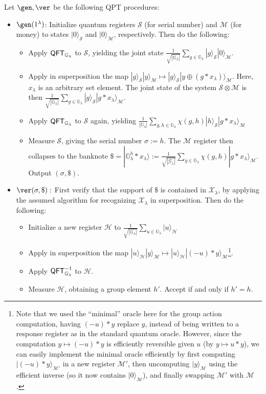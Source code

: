 \documentclass{article}\usepackage[a4paper,margin=20mm]{geometry}
\numberwithin{theorem}{section}
\numberwithin{equation}{section}
\newcommand{\G}{\mathbb{G}}
\newcommand{\Gs}{{\mathcal{G}}}
\newcommand{\Hs}{{\mathcal{H}}}
\newcommand{\Ms}{{\mathcal{M}}}
\newcommand{\Ss}{{\mathcal{S}}}
\newcommand{\Xs}{{\mathcal{X}}}
\newcommand{\QFT}{{\sf QFT}}
\begin{document}
\begin{construction}\label{constr:main} Let $\gen,\ver$ be the following QPT procedures:
	\begin{itemize}
		\item $\gen(1^\lambda)$: Initialize quantum registers $\Ss$ (for serial number) and $\Ms$ (for money) to states $|0\rangle_\Ss$ and $|0\rangle_\Ms$, respectively. Then do the following:
		\begin{itemize}
			\item Apply $\QFT_{\G_\lambda}$ to $\Ss$, yielding the joint state $\frac{1}{\sqrt{|\G_\lambda|}}\sum_{g\in\G_\lambda}|g\rangle_\Ss|0\rangle_\Ms$.
			\item Apply in superposition the map $|g\rangle_\Ss|y\rangle_\Ms\mapsto |g\rangle_\Ss|y\oplus (g*x_\lambda)\rangle_\Ms$. Here, $x_\lambda$ is an arbitrary set element. The joint state of the system $\Ss\otimes\Ms$ is then $\frac{1}{\sqrt{|\G_\lambda|}}\sum_{g\in\G_\lambda}|g\rangle_\Ss|g*x_\lambda\rangle_\Ms$.
			\item Apply $\QFT_{\G_\lambda}$ to $\Ss$ again, yielding $\frac{1}{|\G_\lambda|}\sum_{g,h\in\G_\lambda}\chi(g,h)|h\rangle_\Ss|g*x_\lambda\rangle_\Ms$
			\item Measure $\Ss$, giving the serial number $\sigma:=h$. The $\Ms$ register then collapses to the banknote $\$=|\G_\lambda^h*x_\lambda\rangle:=\frac{1}{\sqrt{|\Gs_\lambda|}}\sum_{g\in\G_\lambda}\chi(g,h)|g*x_\lambda\rangle_\Ms$. Output $(\sigma,\$)$. 
		\end{itemize}
		\item $\ver(\sigma,\$):$ First verify that the support of $\$$ is contained in $\Xs_\lambda$, by applying the assumed algorithm for recognizing $\Xs_\lambda$ in superposition. Then do the following:
		\begin{itemize}
			\item Initialize a new register $\Hs$ to $\frac{1}{\sqrt{|\G_\lambda|}}\sum_{u\in\G_\lambda}|u\rangle_\Hs$
			\item Apply in superposition the map $|u\rangle_\Hs|y\rangle_\Ms\mapsto |u\rangle_\Hs|(-u)*y\rangle_\Ms$\enspace \footnote{Note that we used the ``minimal'' oracle here for the group action computation, having $(-u)*y$ replace $y$, instead of being written to a response register as in the standard quantum oracle. However, since the computation $y\mapsto (-u)*y$ is efficiently reversible given $u$ (by $y\mapsto u*y$), we can easily implement the minimal oracle efficiently by first computing $|(-u)*y\rangle_{\Ms'}$ in a new register $\Ms'$, then uncomputing $|y\rangle_\Ms$ using the efficient inverse (so it now contains $|0\rangle_\Ms$), and finally swapping $\Ms'$ with $\Ms$.}. 
			\item Apply $\QFT^{-1}_{\G_\lambda}$ to $\Hs$.
			\item Measure $\Hs$, obtaining a group element $h'$. Accept if and only if $h'=h$.
		\end{itemize}
	\end{itemize}
\end{construction}
\end{document}
